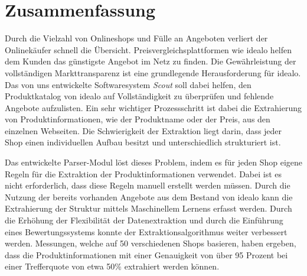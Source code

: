 \section*{Zusammenfassung}
\label{sec:abstract}

Durch die Vielzahl von Onlineshops und Fülle an Angeboten verliert der Onlinekäufer schnell die Übersicht.
Preisvergleichsplattformen wie idealo helfen dem Kunden das günstigste Angebot im Netz zu finden.
Die Gewährleistung der vollständigen Markttransparenz ist eine grundlegende Herausforderung für idealo.
Das von uns entwickelte Softwaresystem \textit{Scout} soll dabei helfen, den Produktkatalog von idealo auf
Vollständigkeit zu überprüfen und fehlende Angebote aufzulisten.
Ein sehr wichtiger Prozessschritt ist dabei die Extrahierung von Produktinformationen, wie der Produktname oder der
Preis, aus den einzelnen Webseiten.
Die Schwierigkeit der Extraktion liegt darin, dass jeder Shop einen individuellen Aufbau besitzt und unterschiedlich
strukturiert ist.

Das entwickelte Parser-Modul löst dieses Problem, indem es für jeden Shop eigene Regeln für die Extraktion der
Produktinformationen verwendet.
Dabei ist es nicht erforderlich, dass diese Regeln manuell erstellt werden müssen.
Durch die Nutzung der bereits vorhanden Angebote aus dem Bestand von idealo kann die Extrahierung der Struktur
mittels Maschinellem Lernens erfasst werden.
Durch die Erhöhung der Flexibilität der Datenextraktion und durch die Einführung eines Bewertungssystems konnte der
Extraktionsalgorithmus weiter verbessert werden.
Messungen, welche auf 50 verschiedenen Shops basieren, haben ergeben, dass die Produktinformationen mit einer
Genauigkeit von über 95 Prozent bei einer Trefferquote von etwa 50\% extrahiert werden können.